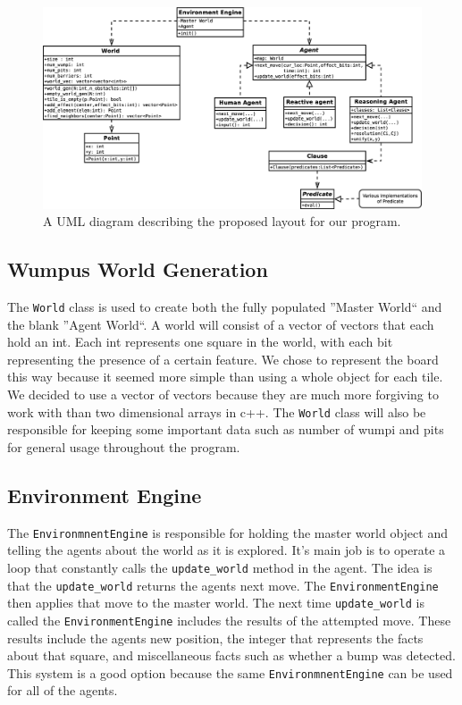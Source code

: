 \documentclass{article}
\begin{document}
	
		   \begin{figure}[h!]
		   	\centering
		   	\includegraphics[width = 1\textwidth]{diagrams/uml_project2}
		   	\caption{A UML diagram describing the proposed layout for our program.}
		   	\label{uml}
		   \end{figure}
		
		\subsection{Wumpus World Generation}
		
			The \texttt{World} class is used to create both the fully populated ''Master World`` and the blank ''Agent World``. 
			A world will consist of a vector of vectors that each hold an int.
			Each int represents one square in the world, with each bit representing the presence of a certain feature. 
			We chose to represent the board this way because it seemed more simple than using a whole object for each tile.
			We decided to use a vector of vectors because they are much more forgiving to work with than two dimensional arrays in c++.
			The \texttt{World} class will also be responsible for keeping some important data such as number of wumpi and pits for general usage throughout the program.
		
		\subsection{Environment Engine}
		The \texttt{EnvironmnentEngine} is responsible for holding the master world object and  telling the agents about the world as it is explored.
		It's main job is to operate a loop that constantly calls the \texttt{update\_world} method in the agent. 
		The idea is that the \texttt{update\_world} returns the agents next move. 
		The \texttt{EnvironmentEngine} then applies that move to the master world.
		The next time \texttt{update\_world} is called the \texttt{EnvironmentEngine} includes the results of the attempted move.
		These results include the agents new position, the integer that represents the facts about that square, and miscellaneous facts such as whether a bump was detected. 
		This system is a good option because the same \texttt{EnvironmnentEngine} can be used for all of the agents. 
\end{document}
